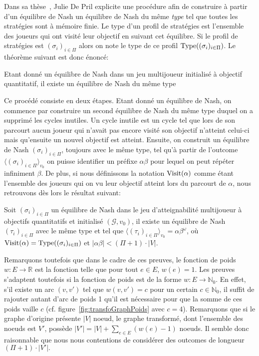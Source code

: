 Dans sa thèse~\cite{juliePhd}, Julie De Pril explicite une procédure afin de construire à partir d'un équilibre de Nash un équilibre de Nash du même \emph{type} tel que toutes les stratégies sont à mémoire finie. Le type d'un profil de stratégies est l'ensemble des joueurs qui ont visité leur objectif en suivant cet équilibre. Si le profil de stratégies est $(\sigma_i)_{i \in \Pi}$ alors on note le type de ce profil $\operatorname*{Type}((\sigma_i)_{i\in \Pi})$. Le théorème suivant est donc énoncé:

\begin{thm}
	Etant donné un équilibre de Nash dans un jeu multijoueur initialisé à objectif quantitatif, il existe un équilibre de Nash du même type
\end{thm}

Ce procédé consiste en deux étapes. Etant donné un équilibre de Nash, on commence par construire un second équilibre de Nash du même type duquel on a supprimé les cycles inutiles. Un cycle inutile est un cycle tel que lors de son parcourt aucun joueur qui n'avait pas encore visité son objectif n'atteint celui-ci mais qu'ensuite un nouvel objectif est atteint. Ensuite, on construit un équilibre de Nash $(\sigma_i)_{i\in \Pi}$, toujours avec le même type, tel qu'à partir de l'outcome $\langle (\sigma_i)_{i\in \Pi}\rangle_{v_0}$ on puisse identifier un préfixe $\alpha\beta$ pour lequel on peut répéter infiniment $\beta$. De plus, si nous définissons la notation $\operatorname*{Visit}(\alpha)$ comme étant l'ensemble des joueurs qui on vu leur objectif atteint lors du parcourt de $\alpha$, nous retrouvons dès lors le résultat suivant:

\begin{propriete}
	\label{prop: rechEqPert1}
	Soit $(\sigma_i)_{i\in \Pi}$ un équilibre de Nash dans le jeu d'atteignabilité multijoueur à objectifs quantitatifs et initialisé $(\mathcal{G}, v_0)$, il existe un équilibre de Nash $(\tau_i)_{i\in \Pi}$ avec le même type et tel que $\langle (\tau_i)_{i\in \Pi} \rangle_{v_0} = \alpha \beta^{\omega}$, où \linebreak $\operatorname*{Visit}(\alpha) = \operatorname*{Type}((\sigma_i)_{i \in \Pi})$ et $|\alpha\beta| < (\Pi + 1)\cdot |V|$.
\end{propriete}
Remarquons toutefois que dans le cadre de ces preuves, le fonction de poids $w: E \rightarrow \mathbb{R}$ est la fonction telle que pour tout $e \in E$, $w(e) = 1$. Les preuves s'adaptent toutefois si la fonction de poids est de la forme \linebreak $w : E \rightarrow \mathbb{N}_{0}$. En effet, s'il existe un arc $(v,v')$ tel que $w(v,v') = c$ pour un certain $c \in \mathbb{N}_{0}$, il suffit de rajouter autant d'arc de poids 1 qu'il est nécessaire pour que la somme de ces poids vaille $c$ (cf. figure~\ref{fig:transfoGraphPoids} avec $c = 4$). Remarquons que si le graphe d'origine présente $|V|$ noeud, le graphe transformé, dont l'ensemble des noeuds est $V'$, possède $|V'| = |V| + \sum_{e \in E} (w(e) - 1)$ noeuds. Il semble donc raisonnable que nous nous contentions de considérer des outcomes de longueur $(\Pi + 1)\cdot |V'|.$\\

